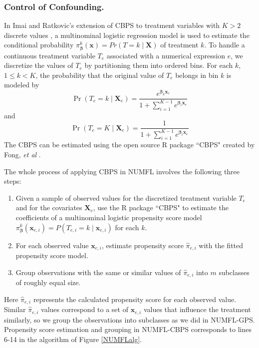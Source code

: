 \subsubsection{Control of Confounding.}
In Imai and Ratkovic's extension of CBPS to treatment variables with $K>2$ discrete values \cite{Hansen1982}, a multinominal logistic regression model is used to estimate the conditional probability $\pi_{\pmb \beta}^k (\pmb{x})=Pr(T=k \mid \pmb{X})$ of treatment $k$. To handle a continuous treatment variable $T_e$ associated with a numerical expression $e$, we discretize the values of $T_e$ by partitioning them into ordered bins.  For each $k$, $1 \leq k<K$, the probability  that the original value of $T_e$ belongs in bin $k$ is modeled by
\begin{equation*}
\Pr ({T_e} = k \mid{\pmb{X}_e}) = \frac{{{e^{{{\pmb \beta} _k}{\pmb{x}_e}}}}}{{1 + \sum\nolimits_{i = 1}^{K - 1} {{e^{{{\pmb \beta} _i}{\pmb{x}_e}}}} }}
\end{equation*}
and
\begin{equation*}
\Pr ({T_e} = K\mid{\pmb{X}_e}) = \frac{1}{{1 + \sum\nolimits_{i = 1}^{K - 1} {{e^{{{\pmb \beta} _i}{\pmb{x}_e}}}} }}
\end{equation*}
The CBPS can be estimated using the open source R package ``CBPS" created by Fong, {\it et al} \cite{CBPS}.

The whole process of applying CBPS in NUMFL involves the following three steps:
\begin{enumerate}
\item 	Given a sample of observed values for the discretized treatment variable $T_e$ and for the covariates $\pmb{X}_e$, use the R package ``CBPS" to estimate the coefficients of a multinominal logistic propensity score model $\pi _{\pmb{\beta}} ^k({\pmb{x}_{e,i}}) = P({T_{e,i}} = k \mid {\pmb{x}_{e,i}})$ for each $k$.
\item	For each observed value ${\pmb x}_{e,i}$, estimate propensity score $\hat \pi _{e,i}$ with the fitted propensity score model.
\item Group observations with the same or similar values of $\hat \pi _{e,i}$ into $m$ subclasses of roughly equal size.
\end{enumerate}

Here $\hat \pi _{e,i}$ represents the calculated propensity score for each observed value.  Similar $\hat \pi _{e,i}$ values correspond to a set of $\pmb{x}_{e,i}$ values that influence the treatment similarly, so we group the observations into subclasses as we did in NUMFL-GPS.  Propensity score estimation and grouping in NUMFL-CBPS corresponds to lines 6-14 in the algorithm of Figure \ref{NUMFLalg}.

